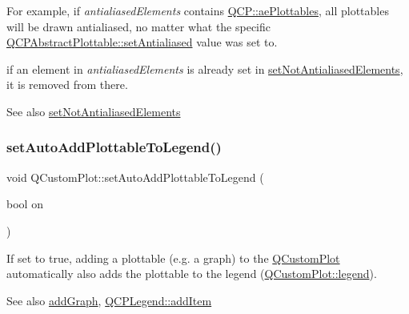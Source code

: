 For example, if {\itshape antialiased\+Elements} contains \mbox{\hyperlink{namespace_q_c_p_ae55dbe315d41fe80f29ba88100843a0ca4145e4251b0cf2dbedabeea0a38f84f6}{Q\+C\+P\+::ae\+Plottables}}, all plottables will be drawn antialiased, no matter what the specific \mbox{\hyperlink{class_q_c_p_layerable_a4fd43e89be4a553ead41652565ff0581}{Q\+C\+P\+Abstract\+Plottable\+::set\+Antialiased}} value was set to.

if an element in {\itshape antialiased\+Elements} is already set in \mbox{\hyperlink{class_q_custom_plot_ae10d685b5eabea2999fb8775ca173c24}{set\+Not\+Antialiased\+Elements}}, it is removed from there.

\begin{DoxySeeAlso}{See also}
\mbox{\hyperlink{class_q_custom_plot_ae10d685b5eabea2999fb8775ca173c24}{set\+Not\+Antialiased\+Elements}} 
\end{DoxySeeAlso}
\mbox{\label{class_q_custom_plot_ad8858410c2db47b7104040a3aa61c3fc}} 
\subsubsection{\texorpdfstring{setAutoAddPlottableToLegend()}{setAutoAddPlottableToLegend()}}
{\footnotesize\ttfamily void Q\+Custom\+Plot\+::set\+Auto\+Add\+Plottable\+To\+Legend (\begin{DoxyParamCaption}\item[{bool}]{on }\end{DoxyParamCaption})}

If set to true, adding a plottable (e.\+g. a graph) to the \mbox{\hyperlink{class_q_custom_plot}{Q\+Custom\+Plot}} automatically also adds the plottable to the legend (\mbox{\hyperlink{class_q_custom_plot_a4eadcd237dc6a09938b68b16877fa6af}{Q\+Custom\+Plot\+::legend}}).

\begin{DoxySeeAlso}{See also}
\mbox{\hyperlink{class_q_custom_plot_a6fb2873d35a8a8089842d81a70a54167}{add\+Graph}}, \mbox{\hyperlink{class_q_c_p_legend_a3ab274de52d2951faea45a6d975e6b3f}{Q\+C\+P\+Legend\+::add\+Item}} 
\end{DoxySeeAlso}
\mbox{\label{class_q_custom_plot_a130358592cfca353ff3cf5571b49fb00}} 
